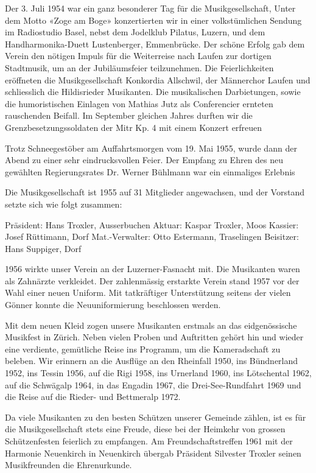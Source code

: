 \begin{multicols}{2}
    Der 3. Juli 1954 war ein ganz besonderer Tag für die
    Musikgesellschaft, Unter dem Motto «Zoge am Boge»
    konzertierten wir in einer volkstümlichen Sendung im
    Radiostudio Basel, nebst dem Jodelklub Pilatus, Luzern,
    und dem Handharmonika-Duett Lustenberger, Emmenbrücke.
    Der schöne Erfolg gab dem Verein den nötigen
    Impuls für die Weiterreise nach Laufen zur dortigen
    Stadtmusik, um an der Jubiläumsfeier teilzunehmen.
    Die Feierlichkeiten eröffneten die Musikgesellschaft
    Konkordia Allschwil, der Männerchor Laufen und
    schliesslich die Hildisrieder Musikanten. Die musikalischen Darbietungen,
    sowie die humoristischen Einlagen von Mathias Jutz als Conferencier ernteten
    rauschenden Beifall. Im September gleichen Jahres
    durften wir die Grenzbesetzungssoldaten der Mitr Kp. 4
    mit einem Konzert erfreuen

    Trotz Schneegestöber am Auffahrtsmorgen vom
    19. Mai 1955, wurde dann der Abend zu einer sehr
    eindrucksvollen Feier. Der Empfang zu Ehren des neu
    gewählten Regierungsrates Dr. Werner Bühlmann
    war ein einmaliges Erlebnis

    Die Musikgesellschaft ist 1955 auf 31 Mitglieder angewachsen, und der Vorstand setzte sich wie folgt
    zusammen:

    Präsident: Hans Troxler, Ausserbuchen
    Aktuar: Kaspar Troxler, Moos
    Kassier: Josef Rüttimann, Dorf
    Mat.-Verwalter: Otto Estermann, Traselingen
    Beisitzer: Hans Suppiger, Dorf

    1956 wirkte unser Verein an der Luzerner-Fasnacht
    mit. Die Musikanten waren als Zahnärzte verkleidet.
    Der zahlenmässig erstarkte Verein stand 1957 vor der
    Wahl einer neuen Uniform. Mit tatkräftiger Unterstützung seitens der vielen
    Gönner konnte die Neuuniformierung beschlossen werden.

    Mit dem neuen Kleid zogen unsere Musikanten
    erstmals an das eidgenössische Musikfest in
    Zürich. Neben vielen Proben und Auftritten gehört
    hin und wieder eine verdiente, gemütliche Reise ins
    Programm, um die Kameradschaft zu beleben. Wir
    erinnern an die Ausflüge an den Rheinfall 1950, ins
    Bündnerland 1952, ins Tessin 1956, auf die Rigi 1958,
    ins Urnerland 1960, ins Lötschental 1962, auf die
    Schwägalp 1964, in das Engadin 1967, die Drei-See-Rundfahrt 1969 und die Reise auf die Rieder- und
    Bettmeralp 1972.

    Da viele Musikanten zu den besten Schützen unserer
    Gemeinde zählen, ist es für die Musikgesellschaft stets
    eine Freude, diese bei der Heimkehr von grossen
    Schützenfesten feierlich zu empfangen. Am Freundschaftstreffen 1961 mit der Harmonie Neuenkirch
    in Neuenkirch übergab Präsident Silvester Troxler
    seinen Musikfreunden die Ehrenurkunde.


\end{multicols}
